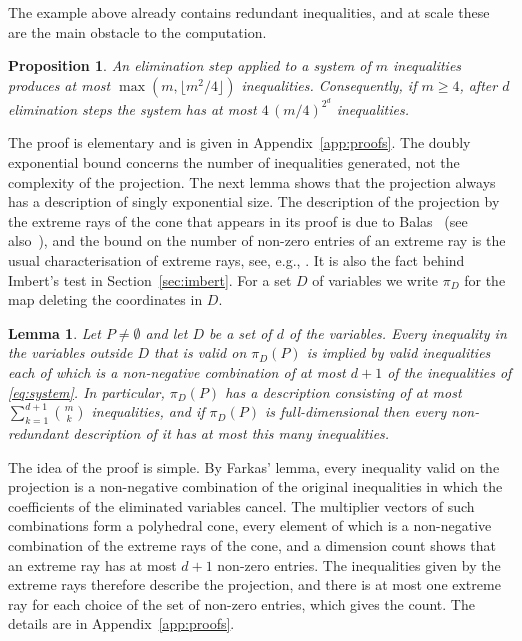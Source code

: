 \documentclass[11pt]{article}
\newtheorem{lemma}{Lemma}
\newtheorem{proposition}{Proposition}
\theoremstyle{definition}
\begin{document}
The example above already contains redundant inequalities, and at scale these are the main obstacle to the computation.

\begin{proposition}
\label{prop:growth}
An elimination step applied to a system of $m$ inequalities produces at most $\max(m,\lfloor m^{2}/4\rfloor)$ inequalities. Consequently, if $m\ge 4$, after $d$ elimination steps the system has at most $4\,(m/4)^{2^{d}}$ inequalities.
\end{proposition}

The proof is elementary and is given in Appendix~\ref{app:proofs}. The doubly exponential bound concerns the number of inequalities generated, not the complexity of the projection. The next lemma shows that the projection always has a description of singly exponential size. The description of the projection by the extreme rays of the cone that appears in its proof is due to Balas~\cite{balas1998} (see also~\cite{monniaux2010}), and the bound on the number of non-zero entries of an extreme ray is the usual characterisation of extreme rays, see, e.g., \cite[Chapter~8]{schrijver1986}. It is also the fact behind Imbert's test in Section~\ref{sec:imbert}. For a set $D$ of variables we write $\pi_D$ for the map deleting the coordinates in $D$.

\begin{lemma}
\label{lem:support}
Let $P\neq\emptyset$ and let $D$ be a set of $d$ of the variables. Every inequality in the variables outside $D$ that is valid on $\pi_D(P)$ is implied by valid inequalities each of which is a non-negative combination of at most $d+1$ of the inequalities of \eqref{eq:system}. In particular, $\pi_D(P)$ has a description consisting of at most $\sum_{k=1}^{d+1}\binom{m}{k}$ inequalities, and if $\pi_D(P)$ is full-dimensional then every non-redundant description of it has at most this many inequalities.
\end{lemma}

The idea of the proof is simple. By Farkas' lemma, every inequality valid on the projection is a non-negative combination of the original inequalities in which the coefficients of the eliminated variables cancel. The multiplier vectors of such combinations form a polyhedral cone, every element of which is a non-negative combination of the extreme rays of the cone, and a dimension count shows that an extreme ray has at most $d+1$ non-zero entries. The inequalities given by the extreme rays therefore describe the projection, and there is at most one extreme ray for each choice of the set of non-zero entries, which gives the count. The details are in Appendix~\ref{app:proofs}.
\end{document}
